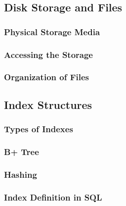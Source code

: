 \subsection{Disk Storage and Files}
\subsubsection{Physical Storage Media}
\subsubsection{Accessing the Storage}
\subsubsection{Organization of Files}

\subsection{Index Structures}
\subsubsection{Types of Indexes}
\subsubsection{B+ Tree}
\subsubsection{Hashing}
\subsubsection{Index Definition in SQL}



